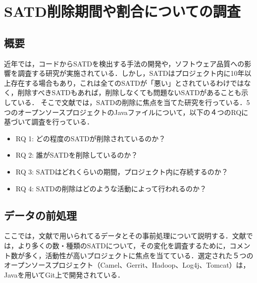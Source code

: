 
\section{SATD削除期間や割合についての調査\cite{satd-removal}}

\subsection{概要}
近年では，コードからSATDを検出する手法の開発や，ソフトウェア品質への影響を調査する研究が実施されている．しかし，SATDはプロジェクト内に10年以上存在する場合もあり，これは全てのSATDが「悪い」とされているわけではなく，削除すべきSATDもあれば，削除しなくても問題ないSATDがあることも示している．
そこで文献\cite{satd-removal}では，SATDの削除に焦点を当てた研究を行っている．5つのオープンソースプロジェクトのJavaファイルについて，以下の４つのRQに基づいて調査を行っている．

\begin{itemize}
  \item RQ 1: どの程度のSATDが削除されているのか？
  \item RQ 2: 誰がSATDを削除しているのか？
  \item RQ 3: SATDはどれくらいの期間，プロジェクト内に存続するのか？
  \item RQ 4: SATDの削除はどのような活動によって行われるのか？
\end{itemize}


\subsection{データの前処理}
ここでは，文献\cite{satd-removal}で用いられてるデータとその事前処理について説明する．文献\cite{satd-removal}では，より多くの数・種類のSATDについて，その変化を調査するために，コメント数が多く，活動性が高いプロジェクトに焦点を当てている．選定された５つのオープンソースプロジェクト（Camel、Gerrit、Hadoop、Log4j、Tomcat）は，Javaを用いてGit上で開発されている．

